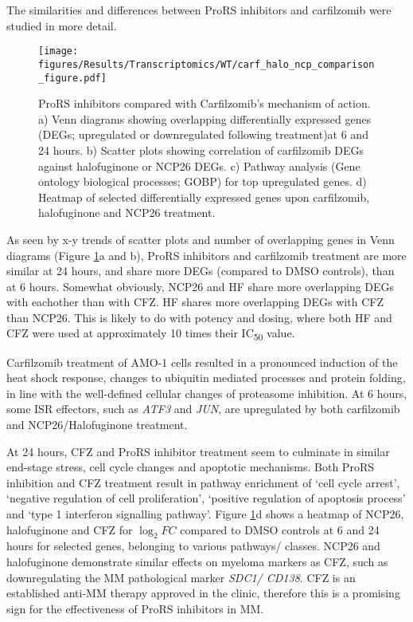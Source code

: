 The similarities and differences between ProRS inhibitors and carfilzomib were studied in more detail.
\begin{figure}[p]
\centering
\texttt{[image: figures/Results/Transcriptomics/WT/carf\_halo\_ncp\_comparison\_figure.pdf]}
\caption[ProRS inhibitors compared with Carfilzomib's mechanism of action]{ProRS inhibitors compared with Carfilzomib's mechanism of action.
a) Venn diagrams showing overlapping differentially expressed genes (DEGs; upregulated or downregulated following treatment)at 6 and 24 hours.
b) Scatter plots showing correlation of carfilzomib DEGs against halofuginone or NCP26 DEGs.
c) Pathway analysis (Gene ontology biological processes; GOBP) for top upregulated genes.
d) Heatmap of selected differentially expressed genes upon carfilzomib, halofuginone and NCP26 treatment.
}
\label{fig:wt_carf_compare}
\end{figure}
As seen by x-y trends of scatter plots and number of overlapping genes in Venn diagrams (Figure \ref{fig:wt_carf_compare}a and b), ProRS inhibitors and carfilzomib treatment are more similar at 24 hours, and share more DEGs (compared to DMSO controls), than at 6 hours.
Somewhat obviously, NCP26 and HF share more overlapping DEGs with eachother than with CFZ\@.
HF shares more overlapping DEGs with CFZ than NCP26.
This is likely to do with potency and dosing, where both HF and CFZ were used at approximately 10 times their IC\textsubscript{50} value.

Carfilzomib treatment of AMO-1 cells resulted in a pronounced induction of the heat shock response, changes to ubiquitin mediated processes and protein folding, in line with the well-defined cellular changes of proteasome inhibition.
At 6 hours, some ISR effectors, such as \textit{ATF3} and \textit{JUN}, are upregulated by both carfilzomib and NCP26/Halofuginone treatment.

At 24 hours, CFZ and ProRS inhibitor treatment seem to culminate in similar end-stage stress, cell cycle changes and apoptotic mechanisms.
Both ProRS inhibition and CFZ treatment result in pathway enrichment of `cell cycle arrest', `negative regulation of cell proliferation', `positive regulation of apoptosis process' and `type 1 interferon signalling pathway'.
Figure \ref{fig:wt_carf_compare}d shows a heatmap of NCP26, halofuginone and CFZ for $\log_{2}FC$ compared to DMSO controls at 6 and 24 hours for selected genes, belonging to various pathways/ classes.
NCP26 and halofuginone demonstrate similar effects on myeloma markers as CFZ, such as downregulating the MM pathological marker \textit{SDC1/ CD138}.
CFZ is an established anti-MM therapy approved in the clinic, therefore this is a promising sign for the effectiveness of ProRS inhibitors in MM\@.



